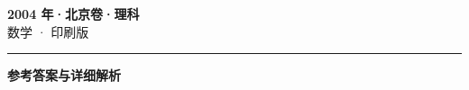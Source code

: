 \documentclass[zihao=5, a4paper]{ctexart}
\begin{document}
\begin{center}
  {\Large\bfseries 2004 年·北京卷·理科}\\[4pt]
  {\large 数学 · 印刷版}
\end{center}
\medskip
{}

\par\bigskip\hrule\bigskip
{}
\begin{center}{\large\bfseries 参考答案与详细解析}\end{center}
\smallskip

\end{document}
